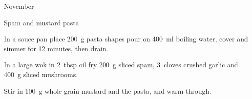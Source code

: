 \begin{menu}{November}
\begin{recipe}{1}{Spam and mustard pasta}
\begin{ingredients}
		\end{ingredients}
	
    \begin{instructions}
    \item 
      In a
      sauce pan
      place
      200~g  pasta shapes
      pour on
      400~ml  boiling water,
      cover and simmer for 12 minutes, then drain.
    \item 
        In a large wok in
        2~tbsp  oil
        fry
        200~g sliced spam,
        3~cloves crushed garlic
        and
        400~g sliced mushrooms.
      \item 
        Stir in
        100~g  whole grain mustard
        and the pasta,
        and warm through.
      
    \end{instructions}
    \end{recipe}%
  
    \clearpage
    \end{menu}
	
